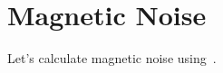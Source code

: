 \documentclass[11pt]{article}
\begin{document}
	\graphicspath{{figures/}}

	\section{Magnetic Noise} \label{sec:intro}

	Let's calculate magnetic noise using~\cite{Nam1967}.

	\newpage
	\listoftodos
	\newpage
	\printbibliography
\end{document}
